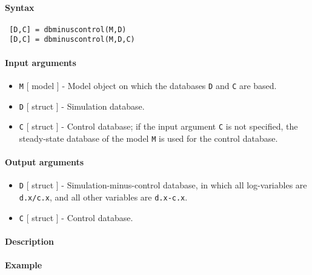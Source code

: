 


	\paragraph{Syntax}
 
 \begin{verbatim}
 [D,C] = dbminuscontrol(M,D)
 [D,C] = dbminuscontrol(M,D,C)
 \end{verbatim}
 
 \paragraph{Input arguments}
 
 \begin{itemize}
 \item
   \texttt{M} {[} model {]} - Model object on which the databases
   \texttt{D} and \texttt{C} are based.
 \item
   \texttt{D} {[} struct {]} - Simulation database.
 \item
   \texttt{C} {[} struct {]} - Control database; if the input argument
   \texttt{C} is not specified, the steady-state database of the model
   \texttt{M} is used for the control database.
 \end{itemize}
 
 \paragraph{Output arguments}
 
 \begin{itemize}
 \item
   \texttt{D} {[} struct {]} - Simulation-minus-control database, in
   which all log-variables are \texttt{d.x/c.x}, and all other variables
   are \texttt{d.x-c.x}.
 \item
   \texttt{C} {[} struct {]} - Control database.
 \end{itemize}
 
 \paragraph{Description}
 
 \paragraph{Example}
 
